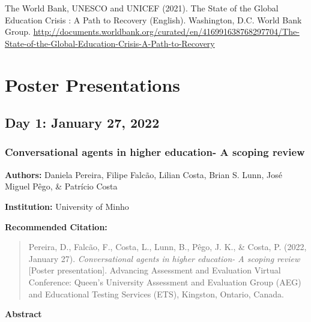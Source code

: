 \documentclass[
]{book}
\begin{document}
The World Bank, UNESCO and UNICEF (2021). The State of the Global Education Crisis : A Path to Recovery (English). Washington, D.C. World Bank Group. \url{http://documents.worldbank.org/curated/en/416991638768297704/The-State-of-the-Global-Education-Crisis-A-Path-to-Recovery}

\newpage

\hypertarget{poster-presentations}{%
\chapter{Poster Presentations}\label{poster-presentations}}

\hypertarget{day-1-january-27-2022}{%
\section{Day 1: January 27, 2022}\label{day-1-january-27-2022}}

\hypertarget{conversational-agents-in-higher-education--a-scoping-review}{%
\subsection{Conversational agents in higher education- A scoping review}\label{conversational-agents-in-higher-education--a-scoping-review}}

\textbf{Authors:} Daniela Pereira, Filipe Falcão, Lilian Costa, Brian S. Lunn, José Miguel Pêgo, \& Patrício Costa

\textbf{Institution:} University of Minho

\textbf{Recommended Citation:}

\begin{quote}
Pereira, D., Falcão, F., Costa, L., Lunn, B., Pêgo, J. K., \& Costa, P. (2022, January 27). \emph{Conversational agents in higher education- A scoping review} {[}Poster presentation{]}. Advancing Assessment and Evaluation Virtual Conference: Queen's University Assessment and Evaluation Group (AEG) and Educational Testing Services (ETS), Kingston, Ontario, Canada.
\end{quote}

\textbf{Abstract}
\end{document}
